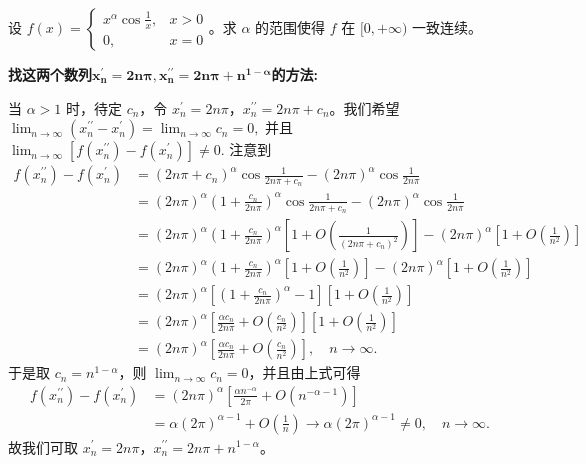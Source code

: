 \documentclass[../../main.tex]{subfiles}
\begin{document}
\begin{example}
设 \( f(x) = \begin{cases} 
x^\alpha \cos \frac{1}{x}, & x > 0 \\ 
0, & x = 0 
\end{cases} \)。求 \(\alpha\) 的范围使得 \(f\) 在 \([0, +\infty)\) 一致连续。
\end{example}
\begin{note}
\hypertarget{找两个数列的方式123}{\textbf{找这两个数列$\boldsymbol{x}_{\boldsymbol{n}}^{\prime}=\mathbf{2}\boldsymbol{n\pi },\boldsymbol{x}_{\boldsymbol{n}}^{\prime\prime}=\mathbf{2}\boldsymbol{n\pi }+\boldsymbol{n}^{\mathbf{1}-\boldsymbol{\alpha }}$的方法:}}
当 $\alpha > 1$ 时，待定 $c_n$，令 $x_{n}^{\prime} = 2n\pi$，$x_{n}^{\prime\prime} = 2n\pi + c_n$。我们希望
\(
\lim_{n \rightarrow \infty} \left( x_{n}^{\prime\prime} - x_{n}^{\prime} \right) = \lim_{n \rightarrow \infty} c_n = 0,
\)
并且
\(
\lim_{n \rightarrow \infty} \left[ f\left( x_{n}^{\prime\prime} \right) - f\left( x_{n}^{\prime} \right) \right] \ne 0.
\)
注意到
\begin{align*}
f\left( x_{n}^{\prime\prime} \right) - f\left( x_{n}^{\prime} \right) &= \left( 2n\pi + c_n \right)^{\alpha} \cos \frac{1}{2n\pi + c_n} - \left( 2n\pi \right)^{\alpha} \cos \frac{1}{2n\pi} \\
&= \left( 2n\pi \right)^{\alpha} \left( 1 + \frac{c_n}{2n\pi} \right)^{\alpha} \cos \frac{1}{2n\pi + c_n} - \left( 2n\pi \right)^{\alpha} \cos \frac{1}{2n\pi} \\
&= \left( 2n\pi \right)^{\alpha} \left( 1 + \frac{c_n}{2n\pi} \right)^{\alpha} \left[ 1 + O\left( \frac{1}{\left( 2n\pi + c_n \right)^2} \right) \right] - \left( 2n\pi \right)^{\alpha} \left[ 1 + O\left( \frac{1}{n^2} \right) \right] \\
&= \left( 2n\pi \right)^{\alpha} \left( 1 + \frac{c_n}{2n\pi} \right)^{\alpha} \left[ 1 + O\left( \frac{1}{n^2} \right) \right] - \left( 2n\pi \right)^{\alpha} \left[ 1 + O\left( \frac{1}{n^2} \right) \right] \\
&= \left( 2n\pi \right)^{\alpha} \left[ \left( 1 + \frac{c_n}{2n\pi} \right)^{\alpha} - 1 \right] \left[ 1 + O\left( \frac{1}{n^2} \right) \right] \\
&= \left( 2n\pi \right)^{\alpha} \left[ \frac{\alpha c_n}{2n\pi} + O\left( \frac{c_n}{n^2} \right) \right] \left[ 1 + O\left( \frac{1}{n^2} \right) \right] \\
&= \left( 2n\pi \right)^{\alpha} \left[ \frac{\alpha c_n}{2n\pi} + O\left( \frac{c_n}{n^2} \right) \right], \quad n \rightarrow \infty.
\end{align*}
于是取 $c_n = n^{1 - \alpha}$，则 $\lim_{n \rightarrow \infty} c_n = 0$，并且由上式可得
\begin{align*}
f\left( x_{n}^{\prime\prime} \right) - f\left( x_{n}^{\prime} \right) &= \left( 2n\pi \right)^{\alpha} \left[ \frac{\alpha n^{-\alpha}}{2\pi} + O\left( n^{-\alpha - 1} \right) \right] \\
&= \alpha \left( 2\pi \right)^{\alpha - 1} + O\left( \frac{1}{n} \right) \rightarrow \alpha \left( 2\pi \right)^{\alpha - 1} \ne 0, \quad n \rightarrow \infty.
\end{align*}
故我们可取 $x_{n}^{\prime} = 2n\pi$，$x_{n}^{\prime\prime} = 2n\pi + n^{1 - \alpha}$。
\end{note}
\end{document}

